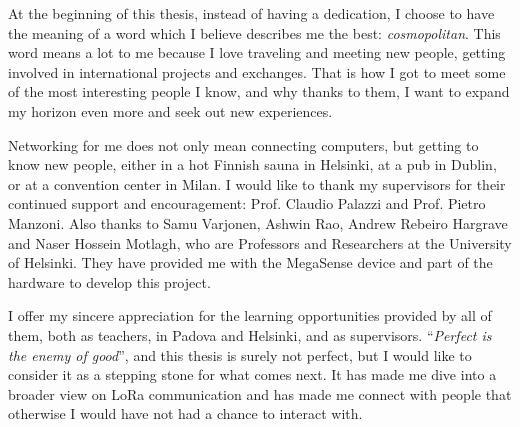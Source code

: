 
At the beginning of this thesis, instead of having a dedication, I choose to have the meaning of a word which I believe describes me the best: \textit{cosmopolitan}.
This word means a lot to me because I love traveling and meeting new people, getting involved in international projects and exchanges.
That is how I got to meet some of the most interesting people I know, and why thanks to them, I want to expand my horizon even more and seek out new experiences.

Networking for me does not only mean connecting computers, but getting to know new people, either in a hot Finnish sauna in Helsinki, at a pub in Dublin, or at a convention center in Milan.
\newline
\newline
\indent
I would like to thank my supervisors for their continued support and encouragement: Prof. Claudio Palazzi and Prof. Pietro Manzoni.
Also thanks to Samu Varjonen, Ashwin Rao, Andrew Rebeiro Hargrave and ‪Naser Hossein Motlagh‬, who are Professors and Researchers at the University of Helsinki.
They have provided me with the MegaSense device and part of the hardware to develop this project.

I offer my sincere appreciation for the learning opportunities provided by all of them, both as teachers, in Padova and Helsinki, and as supervisors.
\newline
\newline
\indent
``\textit{Perfect is the enemy of good}'', and this thesis is surely not perfect, but I would like to consider it as a stepping stone for what comes next.
It has made me dive into a broader view on LoRa communication and has made me connect with people that otherwise I would have not had a chance to interact with.